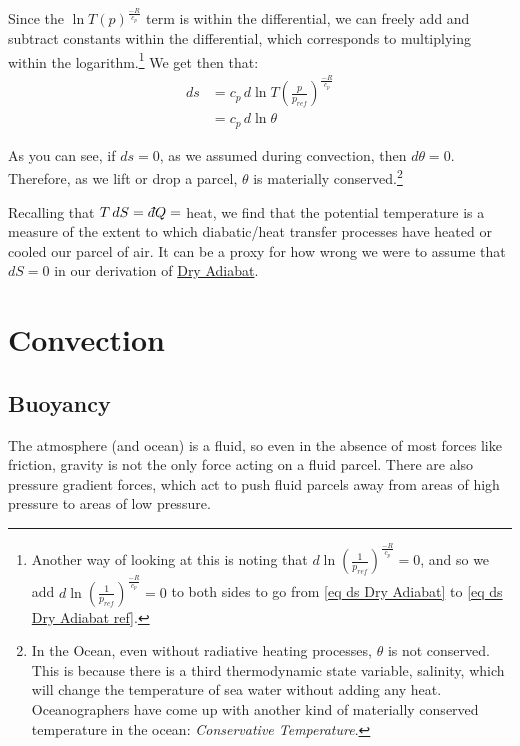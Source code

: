 Since the \(\ln T(p)^\frac{-R}{c_p}\) term is within the differential, we can freely add and subtract constants within the differential, which corresponds to multiplying within the logarithm.\footnote{
    Another way of looking at this is noting that \(d \ln \left(\frac{1}{p_{ref}}\right)^\frac{-R}{c_p}=0\), and so we add \(d \ln \left(\frac{1}{p_{ref}}\right)^\frac{-R}{c_p}=0\) to both sides to go from \ref{eq ds Dry Adiabat} to \ref{eq ds Dry Adiabat ref}.
} We get then that:
\begin{equation}
    \label{eq ds Dry Adiabat ref}
    \begin{aligned}
        ds&=c_p\,d\ln T\left(\frac{p}{p_{ref}}\right)^\frac{-R}{c_p}
        \\
        &=c_p\,d\ln\theta
    \end{aligned}
\end{equation}

As you can see, if \(ds=0\), as we assumed during convection, then \(d\theta=0\). Therefore, as we lift or drop a parcel, \(\theta\) is materially conserved.\footnote{In the Ocean, even without radiative heating processes, \(\theta\) is not conserved. This is because there is a third thermodynamic state variable, salinity, which will change the temperature of sea water without adding any heat. Oceanographers have come up with another kind of materially conserved temperature in the ocean: \textit{Conservative Temperature}.}

Recalling that \(T\,dS=\,\dbar Q=\) heat, we find that the potential temperature is a measure of the extent to which diabatic/heat transfer processes have heated or cooled our parcel of air. It can be a proxy for how wrong we were to assume that \(dS=0\) in our derivation of \hyperref[Dry Adiabat]{Dry Adiabat}.

\section{Convection}\label{Convection}

\subsection{Buoyancy}

The atmosphere (and ocean) is a fluid, so even in the absence of most forces like friction, gravity is not the only force acting on a fluid parcel. There are also pressure gradient forces, which act to push fluid parcels away from areas of high pressure to areas of low pressure.

